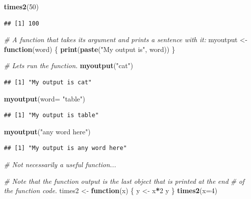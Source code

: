 \documentclass[
]{book}
\newenvironment{Shaded}{\begin{snugshade}}{\end{snugshade}}
\newcommand{\AttributeTok}[1]{\textcolor[rgb]{0.13,0.29,0.53}{#1}}
\newcommand{\CommentTok}[1]{\textcolor[rgb]{0.56,0.35,0.01}{\textit{#1}}}
\newcommand{\ControlFlowTok}[1]{\textcolor[rgb]{0.13,0.29,0.53}{\textbf{#1}}}
\newcommand{\DecValTok}[1]{\textcolor[rgb]{0.00,0.00,0.81}{#1}}
\newcommand{\FunctionTok}[1]{\textcolor[rgb]{0.13,0.29,0.53}{\textbf{#1}}}
\newcommand{\NormalTok}[1]{#1}
\newcommand{\OtherTok}[1]{\textcolor[rgb]{0.56,0.35,0.01}{#1}}
\newcommand{\SpecialCharTok}[1]{\textcolor[rgb]{0.81,0.36,0.00}{\textbf{#1}}}
\newcommand{\StringTok}[1]{\textcolor[rgb]{0.31,0.60,0.02}{#1}}
\begin{document}
\begin{Shaded}
\begin{Highlighting}[]
\FunctionTok{times2}\NormalTok{(}\DecValTok{50}\NormalTok{)}
\end{Highlighting}
\end{Shaded}

\begin{verbatim}
## [1] 100
\end{verbatim}

\begin{Shaded}
\begin{Highlighting}[]
\CommentTok{\# A function that takes its argument and prints a sentence with it:}
\NormalTok{myoutput }\OtherTok{\textless{}{-}} \ControlFlowTok{function}\NormalTok{(word) \{}
  \FunctionTok{print}\NormalTok{(}\FunctionTok{paste}\NormalTok{(}\StringTok{"My output is"}\NormalTok{, word))}
\NormalTok{\}}

\CommentTok{\# Let\textquotesingle{}s run the function.}
\FunctionTok{myoutput}\NormalTok{(}\StringTok{"cat"}\NormalTok{)}
\end{Highlighting}
\end{Shaded}

\begin{verbatim}
## [1] "My output is cat"
\end{verbatim}

\begin{Shaded}
\begin{Highlighting}[]
\FunctionTok{myoutput}\NormalTok{(}\AttributeTok{word=} \StringTok{"table"}\NormalTok{)}
\end{Highlighting}
\end{Shaded}

\begin{verbatim}
## [1] "My output is table"
\end{verbatim}

\begin{Shaded}
\begin{Highlighting}[]
\FunctionTok{myoutput}\NormalTok{(}\StringTok{"any word here"}\NormalTok{)}
\end{Highlighting}
\end{Shaded}

\begin{verbatim}
## [1] "My output is any word here"
\end{verbatim}

\begin{Shaded}
\begin{Highlighting}[]
\CommentTok{\# Not necessarily a useful function...}

\CommentTok{\# Note that the function output is the last object that is printed at the end}
\CommentTok{\# of the function code.}
\NormalTok{times2 }\OtherTok{\textless{}{-}} \ControlFlowTok{function}\NormalTok{(x) \{}
\NormalTok{  y }\OtherTok{\textless{}{-}}\NormalTok{ x}\SpecialCharTok{*}\DecValTok{2}
\NormalTok{  y}
\NormalTok{\}}
\FunctionTok{times2}\NormalTok{(}\AttributeTok{x=}\DecValTok{4}\NormalTok{)}
\end{Highlighting}
\end{Shaded}
\end{document}
